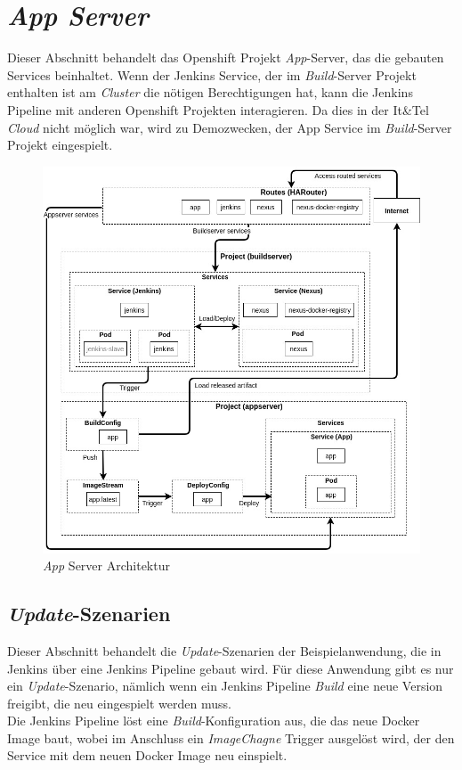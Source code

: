 \section{\emph{App Server}}
\label{sec:appserver}
Dieser Abschnitt behandelt das Openshift Projekt \emph{App}-Server, das die gebauten Services beinhaltet. Wenn der Jenkins Service, der im \emph{Build}-Server Projekt enthalten ist am \emph{Cluster} die nötigen Berechtigungen hat, kann die Jenkins Pipeline mit anderen Openshift Projekten interagieren. Da dies in der It\&Tel \emph{Cloud} nicht möglich war, wird zu Demozwecken, der App Service im \emph{Build}-Server Projekt eingespielt. 

\begin{figure}[H]
	\centering
	\includegraphics[scale=0.4]{logos/architecture-diagram-appserver.jpg}
	\caption{\emph{App} Server Architektur}
	\label{fig:appserver}
\end{figure}

\subsection{\emph{Update}-Szenarien}
Dieser Abschnitt behandelt die \emph{Update}-Szenarien der Beispielanwendung, die in Jenkins über eine Jenkins Pipeline gebaut wird. Für diese Anwendung gibt es nur ein \emph{Update}-Szenario, nämlich wenn ein Jenkins Pipeline \emph{Build} eine neue Version freigibt, die neu eingespielt werden muss. \\

Die Jenkins Pipeline löst eine \emph{Build}-Konfiguration aus, die das neue Docker Image baut, wobei im Anschluss ein \emph{ImageChagne} Trigger ausgelöst wird, der den Service mit dem neuen Docker Image neu einspielt.
